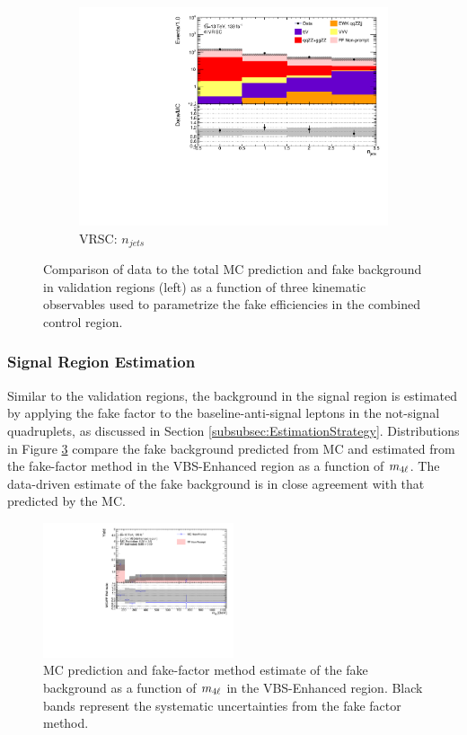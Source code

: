 \begin{figure}[htb]
\begin{subfigure}{.48\textwidth}
        \includegraphics[width = 0.85\linewidth]{figures/Analysis/Background/Overlay_VRSC_FFApplied_n_jets.pdf}
        \caption{VRSC: $n_{jets}$ \label{fig:AllDataMCYield_VRSC_njet}}
    \end{subfigure}
        \caption{ Comparison of data to the total MC prediction and fake background in validation regions (left) as a function of three kinematic observables used to parametrize the fake efficiencies in the combined control region.\label{fig:AllDataMCYield}}
\end{figure}

\subsubsection{Signal Region Estimation}
\label{subsubsec:SREstimation}
Similar to the validation regions, the background in the signal region is estimated by applying the fake factor to the baseline-anti-signal leptons in the not-signal quadruplets, as discussed in Section \ref{subsubsec:EstimationStrategy}. Distributions in Figure \ref{fig:MCFFRedComparison} compare the fake background predicted from MC and estimated from the fake-factor method in the VBS-Enhanced region as a function of $m_{4\ell}$. The data-driven estimate of the fake background is in close agreement with that predicted by the MC.

\begin{figure}[htb]
    \centering
    \includegraphics[width=0.5\textwidth]{figures/Analysis/Background/MCRedCompare_VBS_Enhanced_M4l.pdf}
    \caption{ MC prediction and fake-factor method estimate of the fake background as a function of $m_{4\ell}$ in the VBS-Enhanced region. Black bands represent the systematic uncertainties from the fake factor method. \label{fig:MCFFRedComparison}}
\end{figure}

